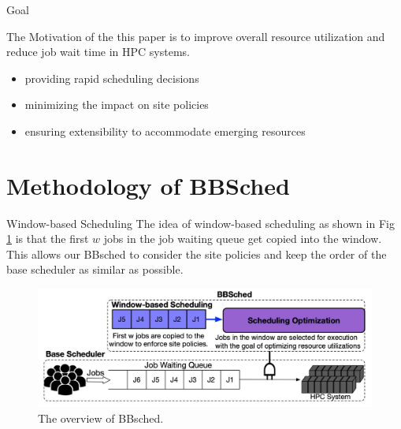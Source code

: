 \documentclass[aspectratio=1610]{beamer}
\begin{document}
\begin{frame}{Goal}

    The Motivation of the this paper is to improve overall resource utilization and reduce job wait time in HPC systems.

    \begin{itemize}
        \item providing rapid scheduling decisions
        \item minimizing the impact on site policies
        \item ensuring extensibility to accommodate emerging resources
    \end{itemize}
   
\end{frame}

\section{Methodology of BBSched}

\begin{frame}{Window-based Scheduling}
    The idea of window-based scheduling as shown in Fig \ref{fig:BBsched} is that the first $w$ jobs in the job waiting queue get copied into the window.   \\

    This allows our BBsched to consider the site policies and keep the order of the base scheduler as similar as possible.
    \begin{figure}[htpb]
        \begin{center}
            \includegraphics[keepaspectratio, scale=0.2]{pic/BBSched.jpg}
            \caption{The overview of BBsched.}
            \label{fig:BBsched}
        \end{center}
     \end{figure}
\end{frame}
\end{document}
